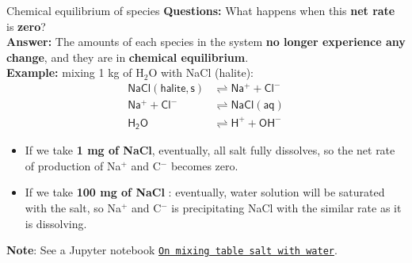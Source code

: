 \begin{frame}{Chemical equilibrium of species}
%
\alert{\textbf{Questions:}} What happens when this \textbf{net rate} is \alert{\textbf{zero}}? \\\textbf{Answer:} The amounts of each species in the system \textbf{no longer experience
any change}, and they are in \alert{\textbf{chemical equilibrium}}. \\[5pt]
%
\pause
\alert{\textbf{Example:}}
mixing 1 kg of H$_{2}$O with NaCl (halite):\\[-20pt] 
%
\begin{align*}
\mathsf{NaCl(halite, s)} & \rightleftharpoons\mathsf{Na^{+}+Cl^{-}}\\[-1pt]
\mathsf{Na^{+}+Cl^{-}} & \rightleftharpoons\mathsf{NaCl(aq)}\\[-1pt]
\mathsf{H_{2}O} & \rightleftharpoons\mathsf{H^{+}+OH^{-}}
\end{align*}
%
\vskip -5pt
\pause
\begin{itemize}
%
\item If we take \alert{\textbf{1 mg of NaCl}}, eventually, all salt fully dissolves, so the net rate of production of Na$^{+}$ and C$^-$ becomes zero.
%
\pause
\item If we take \alert{\textbf{100 mg of NaCl }}: eventually, water solution will be saturated with the salt, so Na$^{+}$ and C$^-$  is precipitating NaCl with the similar rate as it is dissolving.
\end{itemize}
\pause
\alert{\textbf{Note}}: See a Jupyter notebook \href{https://github.com/mtsveta/reaktoro-v2-workshop/blob/main/tutorials/solubility/solubility-tablesalt-water.ipynb}{\textcolor{indigo(dye)}{\tt On mixing table salt with water}}.

\end{frame}
%
%
